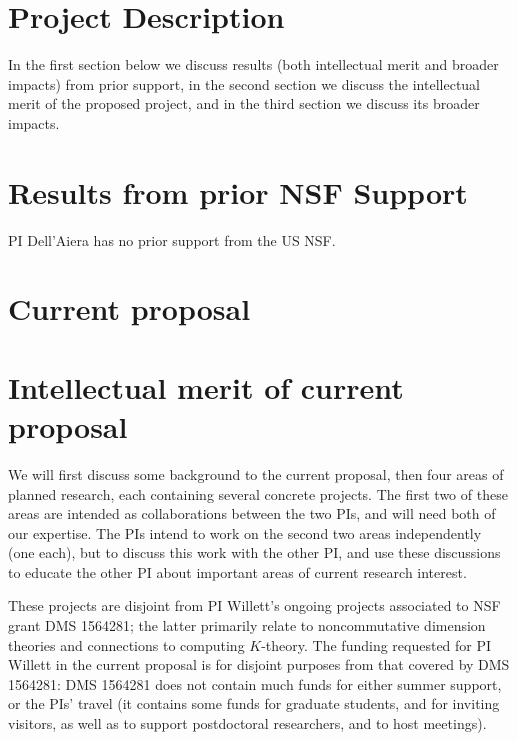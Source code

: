 \documentclass[11pt]{article}
\theoremstyle{plain}
\theoremstyle{definition}
\theoremstyle{remark}
\begin{document}
\section*{Project Description}



In the first section below we discuss results (both intellectual merit and broader impacts) from prior support, in the second section we discuss the intellectual merit of the proposed project, and in the third section we discuss its broader impacts.
 
\section{Results from prior NSF Support}

PI Dell'Aiera has no prior support from the US NSF.  

\section{Current proposal}


\newpage

\section{Intellectual merit of current proposal}\label{imc}

We will first discuss some background to the current proposal, then four areas of planned research, each containing several concrete projects.  The first two of these areas are intended as collaborations between the two PIs, and will need both of our expertise.  The PIs intend to work on the second two areas independently (one each), but to discuss this work with the other PI, and use these discussions to educate the other PI about important areas of current research interest.  

These projects are disjoint from PI Willett's ongoing projects associated to NSF grant DMS 1564281; the latter primarily relate to noncommutative dimension theories and connections to computing $K$-theory.  The funding requested for PI Willett in the current proposal is for disjoint purposes from that covered by DMS 1564281: DMS 1564281 does not contain much funds for either summer support, or the PIs' travel (it contains some funds for graduate students, and for inviting visitors, as well as to support postdoctoral researchers, and to host meetings).
\end{document}
